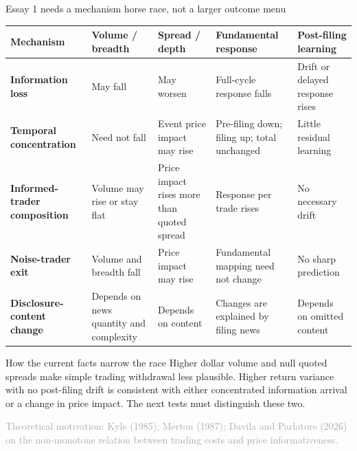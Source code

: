 \documentclass[aspectratio=169,10pt]{beamer}
\newcommand{\source}[1]{\vfill{\scriptsize\textcolor{DarkGray}{#1}}}
\begin{document}
\begin{frame}[t]{Essay 1 needs a mechanism horse race, not a larger outcome menu}
\scriptsize
\renewcommand{\arraystretch}{1.25}
\setlength{\tabcolsep}{0.08cm}
\begin{tabularx}{\textwidth}{>{\bfseries\RaggedRight\arraybackslash}p{2.35cm} >{\RaggedRight\arraybackslash}X >{\RaggedRight\arraybackslash}X >{\RaggedRight\arraybackslash}X >{\RaggedRight\arraybackslash}X}
\toprule
Mechanism & Volume / breadth & Spread / depth & Fundamental response & Post-filing learning \\
\midrule
Information loss & May fall & May worsen & Full-cycle response falls & Drift or delayed response rises \\
Temporal concentration & Need not fall & Event price impact may rise & Pre-filing down; filing up; total unchanged & Little residual learning \\
Informed-trader composition & Volume may rise or stay flat & Price impact rises more than quoted spread & Response per trade rises & No necessary drift \\
Noise-trader exit & Volume and breadth fall & Price impact may rise & Fundamental mapping need not change & No sharp prediction \\
Disclosure-content change & Depends on news quantity and complexity & Depends on content & Changes are explained by filing news & Depends on omitted content \\
\bottomrule
\end{tabularx}

\vspace{0.20cm}
\begin{exampleblock}{How the current facts narrow the race}
Higher dollar volume and null quoted spreads make simple trading withdrawal less plausible. Higher return variance with no post-filing drift is consistent with either concentrated information arrival or a change in price impact. The next tests must distinguish these two.
\end{exampleblock}

\source{Theoretical motivation: Kyle (1985); Merton (1987); Davila and Parlatore (2026) on the non-monotone relation between trading costs and price informativeness.}
\end{frame}
\end{document}
